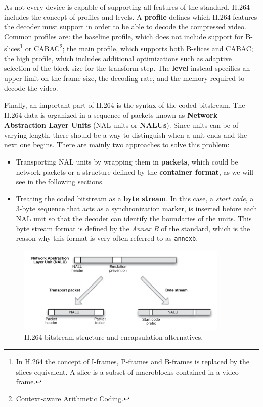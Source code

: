 As not every device is capable of supporting all features of the standard, H.264 includes the concept of profiles and levels. A \textbf{profile} defines which H.264 features the decoder must support in order to be able to decode the compressed video. Common profiles are: the baseline profile, which does not include support for B-slices\footnote{In H.264 the concept of I-frames, P-frames and B-frames is replaced by the slices equivalent. A slice is a subset of macroblocks contained in a video frame.} or CABAC\footnote{Context-aware Arithmetic Coding.}; the main profile, which supports both B-slices and CABAC; the high profile, which includes additional optimizations such as adaptive selection of the block size for the transform step. The \textbf{level} instead specifies an upper limit on the frame size, the decoding rate, and the memory required to decode the video.

Finally, an important part of H.264 is the syntax of the coded bitstream. The H.264 data is organized in a sequence of packets known as \textbf{Network Abstraction Layer Units} (NAL units or \textbf{NALUs}). Since units can be of varying length, there should be a way to distinguish when a unit ends and the next one begins. There are mainly two approaches to solve this problem:

\begin{itemize}
    \item Transporting NAL units by wrapping them in \textbf{packets}, which could be network packets or a structure defined by the \textbf{container format}, as we will see in the following sections.
    \item Treating the coded bitstream as a \textbf{byte stream}. In this case, a \textit{start code}, a 3-byte sequence that acts as a synchronization marker, is inserted before each NAL unit so that the decoder can identify the boundaries of the units. This byte stream format is defined by the \textit{Annex B} of the standard, which is the reason why this format is very often referred to as \texttt{annexb}.
\end{itemize}

\begin{figure}
	\centering
	
	\includegraphics[width=0.9\textwidth]{res/h264_nalu.png}
	
	\caption{H.264 bitstream structure and encapsulation alternatives.}
	\label{fig:h264_scope}
\end{figure}

